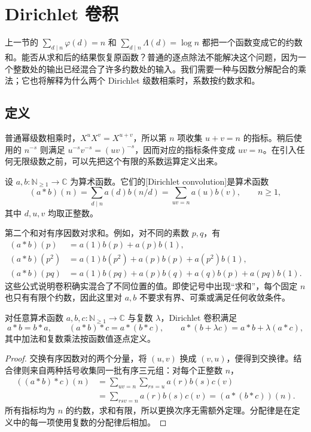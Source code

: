 \section{Dirichlet 卷积}
\label{b3:sec:2502}

上一节的 \(\sum_{d\mid n}\varphi(d)=n\) 和 \(\sum_{d\mid n}\Lambda(d)=\log n\) 都把一个函数变成它的约数和。能否从求和后的结果恢复原函数？普通的逐点除法不能解决这个问题，因为一个整数处的输出已经混合了许多约数处的输入。我们需要一种与因数分解配合的乘法；它也将解释为什么两个 Dirichlet 级数相乘时，系数按约数求和。

\subsection{定义}
\label{b3:subsec:250201}

普通幂级数相乘时，\(X^uX^v=X^{u+v}\)，所以第 \(n\) 项收集 \(u+v=n\) 的指标。稍后使用的 \(n^{-s}\) 则满足 \(u^{-s}v^{-s}=(uv)^{-s}\)，因而对应的指标条件变成 \(uv=n\)。在引入任何无限级数之前，可以先把这个有限的系数运算定义出来。

\begin{definition}\label{b3:def:25-convolution}
设 \(a,b:\mathbb N_{\ge1}\to\mathbb C\) 为算术函数。它们的[Dirichlet convolution]是算术函数
\[
 (a*b)(n)=\sum_{d\mid n}a(d)b(n/d)
         =\sum_{uv=n}a(u)b(v),\qquad n\ge1,
\]
其中 \(d,u,v\) 均取正整数。
\end{definition}

第二个和对有序因数对求和。例如，对不同的素数 \(p,q\)，有
\[
 \begin{aligned}
 (a*b)(p)&=a(1)b(p)+a(p)b(1),\\
 (a*b)(p^2)&=a(1)b(p^2)+a(p)b(p)+a(p^2)b(1),\\
 (a*b)(pq)&=a(1)b(pq)+a(p)b(q)
             +a(q)b(p)+a(pq)b(1).
 \end{aligned}
\]
这些公式说明卷积确实混合了不同位置的值。即使记号中出现“求和”，每个固定 \(n\) 也只有有限个约数，因此这里对 \(a,b\) 不要求有界、可乘或满足任何收敛条件。

\begin{proposition}[有限卷积的代数性质]
\label{b3:prop:25-convolution-algebra}
对任意算术函数 \(a,b,c:\mathbb N_{\ge1}\to\mathbb C\) 与复数 \(\lambda\)，Dirichlet 卷积满足
\[
 a*b=b*a,\qquad (a*b)*c=a*(b*c),
 \qquad a*(b+\lambda c)=a*b+\lambda(a*c),
\]
其中加法和复数乘法按函数值逐点定义。
\end{proposition}
\begin{proof}
交换有序因数对的两个分量，将 \((u,v)\) 换成 \((v,u)\)，便得到交换律。结合律则来自两种括号收集同一批有序三元组：对每个正整数 \(n\)，
\[
 \begin{aligned}
 ((a*b)*c)(n)
 &=\sum_{uv=n}\sum_{rs=u}a(r)b(s)c(v)\\
 &=\sum_{rsv=n}a(r)b(s)c(v)
 =(a*(b*c))(n).
 \end{aligned}
\]
所有指标均为 \(n\) 的约数，求和有限，所以更换次序无需额外定理。分配律是在定义中的每一项使用复数的分配律后相加。
\end{proof}

